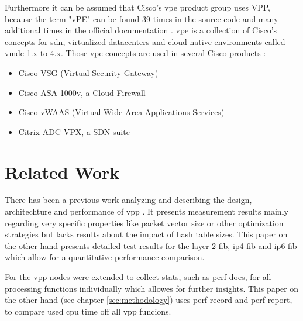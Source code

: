 
Furthermore it can be assumed that Cisco's \Ac{vpe} product group uses
VPP, because the term "vPE" can be found 39 times in the source code
and many additional times in the official documentation
\cite{vppdocs}. \Ac{vpe} is a collection of Cisco's concepts for
\Ac{sdn}, virtualized datacenters and cloud native environments called
\Ac{vmdc} 1.x to 4.x. Those \Ac{vpe} concepts are used in several
Cisco products \cite{cisco:sdn}:

\begin{itemize}
	\item Cisco VSG (Virtual Security Gateway)
	\item Cisco ASA 1000v, a Cloud Firewall
	\item Cisco vWAAS (Virtual Wide Area Applications Services)
	\item Citrix ADC VPX, a SDN suite
\end{itemize}


\section{Related Work}


There has been a previous work analyzing and describing the design,
architechture and performance of \Ac{vpp} \cite{linguaglossa2017high}.
It presents measurement results mainly regarding very specific
properties like packet vector size or other optimization strategies
but lacks results about the impact of hash table sizes. This paper on
the other hand presents detailed test results for the layer 2
\Ac{fib}, \Ac{ip4} \Ac{fib} and \Ac{ip6} \Ac{fib} which allow for a
quantitative performance comparison.


For \cite{linguaglossa2017high} the vpp nodes were extended to collect
stats, such as \Ac{perf} does, for all processing functions
individually which allowes for further insights. This paper on the
other hand (see chapter \ref{sec:methodology}) uses perf-record and
perf-report, to compare used cpu time off all \Ac{vpp} funcions.

